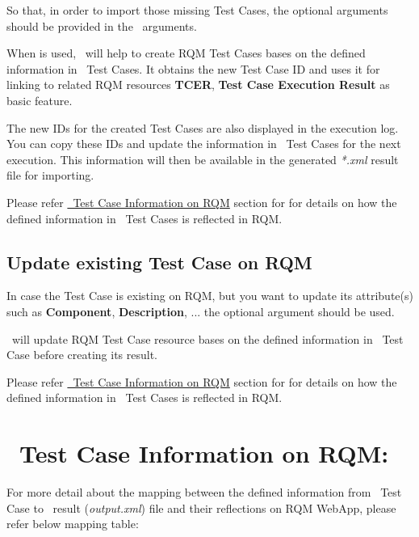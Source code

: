 So that, in order to import those missing  Test Cases, the
optional arguments  should be provided in the \pkg\
arguments.

When  is used, \pkg\ will help to create RQM Test Cases
bases on the defined information in \rfwcore\ Test Cases.
It obtains the new Test Case ID and uses it for linking to related RQM resources 
\textbf{TCER}, \textbf{Test Case Execution Result} as basic feature.

The new IDs for the created Test Cases are also displayed in the execution log.
You can copy these IDs and update the \rcode{TCID-xxx} information in \rfwcore\ 
Test Cases for the next execution. This information will then be available in 
the generated \emph{*.xml} result file for importing.

Please refer \hyperref[description-robot-testcase-information-on-rqm]
{\rfwcore\ Test Case Information on RQM} section for for details on how the 
defined information in \rfwcore\ Test Cases is reflected in RQM.

\subsection{Update existing Test Case on RQM}
In case the Test Case is existing on RQM, but you want to update its attribute(s)
such as \textbf{Component}, \textbf{Description}, ... the optional argument
\rlog{--updatetestcase} should be used.

\pkg\ will update RQM Test Case resource bases on the defined information in
\rfwcore\ Test Case before creating its result.

Please refer \hyperref[description-robot-testcase-information-on-rqm]{\rfwcore\ Test Case Information on RQM}
section for for details on how the defined information in \rfwcore\ Test Cases 
is reflected in RQM.

\hypertarget{description-robot-testcase-information-on-rqm}{%
\section{\rfwcore\ Test Case Information on RQM:}
\label{description-robot-testcase-information-on-rqm}}
For more detail about the mapping between the defined information from \rfwcore\ 
Test Case to \rfwcore\ result (\emph{output.xml}) file and their reflections on
RQM WebApp, please refer below mapping table:

